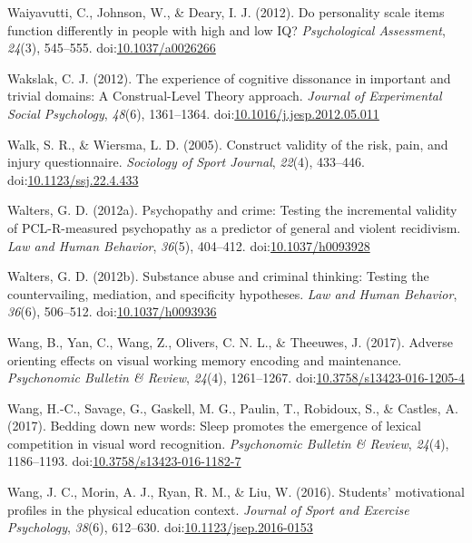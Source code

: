 \documentclass[english,man]{apa6}
\theoremstyle{definition}
\theoremstyle{definition}
\theoremstyle{definition}
\theoremstyle{remark}
\begin{document}
\hypertarget{ref-Waiyavutti2012}{}
Waiyavutti, C., Johnson, W., \& Deary, I. J. (2012). Do personality
scale items function differently in people with high and low IQ?
\emph{Psychological Assessment}, \emph{24}(3), 545--555.
doi:\href{https://doi.org/10.1037/a0026266}{10.1037/a0026266}

\hypertarget{ref-Wakslak2012}{}
Wakslak, C. J. (2012). The experience of cognitive dissonance in
important and trivial domains: A Construal-Level Theory approach.
\emph{Journal of Experimental Social Psychology}, \emph{48}(6),
1361--1364.
doi:\href{https://doi.org/10.1016/j.jesp.2012.05.011}{10.1016/j.jesp.2012.05.011}

\hypertarget{ref-Walk2005}{}
Walk, S. R., \& Wiersma, L. D. (2005). Construct validity of the risk,
pain, and injury questionnaire. \emph{Sociology of Sport Journal},
\emph{22}(4), 433--446.
doi:\href{https://doi.org/10.1123/ssj.22.4.433}{10.1123/ssj.22.4.433}

\hypertarget{ref-Walters2012}{}
Walters, G. D. (2012a). Psychopathy and crime: Testing the incremental
validity of PCL-R-measured psychopathy as a predictor of general and
violent recidivism. \emph{Law and Human Behavior}, \emph{36}(5),
404--412. doi:\href{https://doi.org/10.1037/h0093928}{10.1037/h0093928}

\hypertarget{ref-Walters2012a}{}
Walters, G. D. (2012b). Substance abuse and criminal thinking: Testing
the countervailing, mediation, and specificity hypotheses. \emph{Law and
Human Behavior}, \emph{36}(6), 506--512.
doi:\href{https://doi.org/10.1037/h0093936}{10.1037/h0093936}

\hypertarget{ref-Wang2016}{}
Wang, B., Yan, C., Wang, Z., Olivers, C. N. L., \& Theeuwes, J. (2017).
Adverse orienting effects on visual working memory encoding and
maintenance. \emph{Psychonomic Bulletin \& Review}, \emph{24}(4),
1261--1267.
doi:\href{https://doi.org/10.3758/s13423-016-1205-4}{10.3758/s13423-016-1205-4}

\hypertarget{ref-Wang2016a}{}
Wang, H.-C., Savage, G., Gaskell, M. G., Paulin, T., Robidoux, S., \&
Castles, A. (2017). Bedding down new words: Sleep promotes the emergence
of lexical competition in visual word recognition. \emph{Psychonomic
Bulletin \& Review}, \emph{24}(4), 1186--1193.
doi:\href{https://doi.org/10.3758/s13423-016-1182-7}{10.3758/s13423-016-1182-7}

\hypertarget{ref-Wang2016b}{}
Wang, J. C., Morin, A. J., Ryan, R. M., \& Liu, W. (2016). Students'
motivational profiles in the physical education context. \emph{Journal
of Sport and Exercise Psychology}, \emph{38}(6), 612--630.
doi:\href{https://doi.org/10.1123/jsep.2016-0153}{10.1123/jsep.2016-0153}
\end{document}
